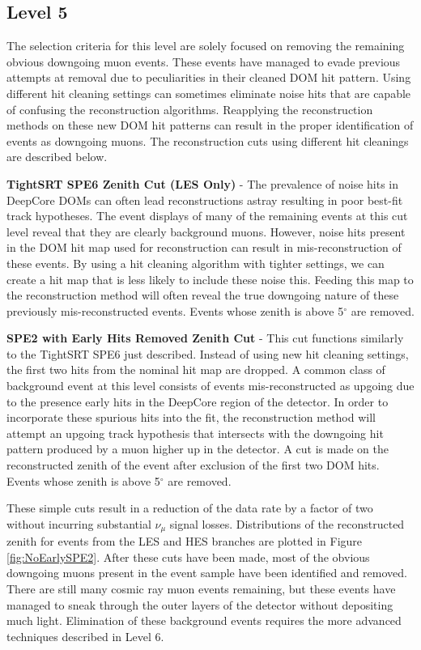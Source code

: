 \documentclass{gatech-thesis}
\begin{document}
\subsection{Level 5}
The selection criteria for this level are solely focused on removing the remaining obvious downgoing muon events. These events have managed to evade previous attempts at removal due to peculiarities in their cleaned DOM hit pattern. Using different hit cleaning settings can sometimes eliminate noise hits that are capable of confusing the reconstruction algorithms. Reapplying the reconstruction methods on these new DOM hit patterns can result in the proper identification of events as downgoing muons. The reconstruction cuts using different hit cleanings are described below.
\begin{adjustwidth}{2.5em}{2.5em}
\setlength{\parindent}{0pt}
\textbf{TightSRT SPE6 Zenith Cut (LES Only)} - The prevalence of noise hits in DeepCore DOMs can often lead reconstructions astray resulting in poor best-fit track hypotheses. The event displays of many of the remaining events at this cut level reveal that they are clearly background muons. However, noise hits present in the DOM hit map used for reconstruction can result in mis-reconstruction of these events. By using a hit cleaning algorithm with tighter settings, we can create a hit map that is less likely to include these noise this. Feeding this map to the reconstruction method will often reveal the true downgoing nature of these previously mis-reconstructed events. Events whose zenith is above 5$^{\circ}$ are removed.

\textbf{SPE2 with Early Hits Removed Zenith Cut} - This cut functions similarly to the TightSRT SPE6 just described. Instead of using new hit cleaning settings, the first two hits from the nominal hit map are dropped. A common class of background event at this level consists of events mis-reconstructed as upgoing due to the presence early hits in the DeepCore region of the detector. In order to incorporate these spurious hits into the fit, the reconstruction method will attempt an upgoing track hypothesis that intersects with the downgoing hit pattern produced by a muon higher up in the detector. A cut is made on the reconstructed zenith of the event after exclusion of the first two DOM hits. Events whose zenith is above 5$^{\circ}$ are removed.
\end{adjustwidth}
\setlength{\parindent}{17.5pt}
These simple cuts result in a reduction of the data rate by a factor of two without incurring substantial $\nu_{\mu}$ signal losses. Distributions of the reconstructed zenith for events from the LES and HES branches are plotted in Figure \ref{fig:NoEarlySPE2}. After these cuts have been made, most of the obvious downgoing muons present in the event sample have been identified and removed. There are still many cosmic ray muon events remaining, but these events have managed to sneak through the outer layers of the detector without depositing much light. Elimination of these background events requires the more advanced techniques described in Level 6.
\end{document}
